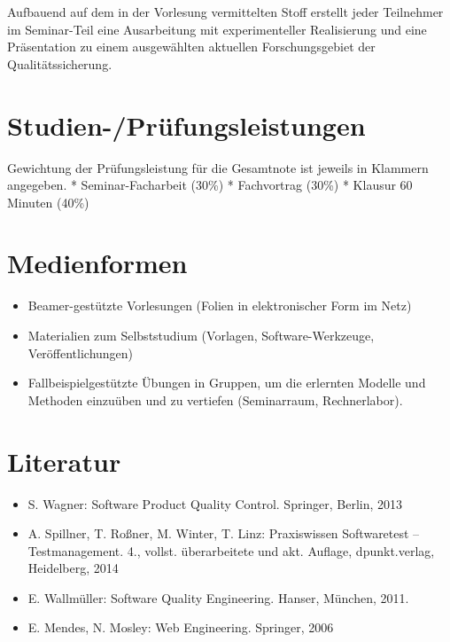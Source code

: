 Aufbauend auf dem in der Vorlesung vermittelten Stoff erstellt jeder
Teilnehmer im Seminar-Teil eine Ausarbeitung mit experimenteller
Realisierung und eine Präsentation zu einem ausgewählten aktuellen
Forschungsgebiet der Qualitätssicherung.

\section*{Studien-/Prüfungsleistungen\label{/mi-2017/modulbeschreibungen-master/MA_WTW_Modul_QUS_Winter}}\label{studien-pruxfcfungsleistungenpathlabelmi-2017modulbeschreibungen-mastermaux5fwtwux5fmodulux5fqusux5fwinter}

Gewichtung der Prüfungsleistung für die Gesamtnote ist jeweils in
Klammern angegeben. * Seminar-Facharbeit (30\%) * Fachvortrag (30\%) *
Klausur 60 Minuten (40\%)

\section*{Medienformen\label{/mi-2017/modulbeschreibungen-master/MA_WTW_Modul_QUS_Winter}}\label{medienformenpathlabelmi-2017modulbeschreibungen-mastermaux5fwtwux5fmodulux5fqusux5fwinter}

\begin{itemize}
\tightlist
\item
  Beamer-gestützte Vorlesungen (Folien in elektronischer Form im Netz)
\item
  Materialien zum Selbststudium (Vorlagen, Software-Werkzeuge,
  Veröffentlichungen)
\item
  Fallbeispielgestützte Übungen in Gruppen, um die erlernten Modelle und
  Methoden einzuüben und zu vertiefen (Seminarraum, Rechnerlabor).
\end{itemize}

\section*{Literatur\label{/mi-2017/modulbeschreibungen-master/MA_WTW_Modul_QUS_Winter}}\label{literaturpathlabelmi-2017modulbeschreibungen-mastermaux5fwtwux5fmodulux5fqusux5fwinter}

\begin{itemize}
\tightlist
\item
  S. Wagner: Software Product Quality Control. Springer, Berlin, 2013
\item
  A. Spillner, T. Roßner, M. Winter, T. Linz: Praxiswissen Softwaretest
  -- Testmanagement. 4., vollst. überarbeitete und akt. Auflage,
  dpunkt.verlag, Heidelberg, 2014
\item
  E. Wallmüller: Software Quality Engineering. Hanser, München, 2011.
\item
  E. Mendes, N. Mosley: Web Engineering. Springer, 2006
\end{itemize}

